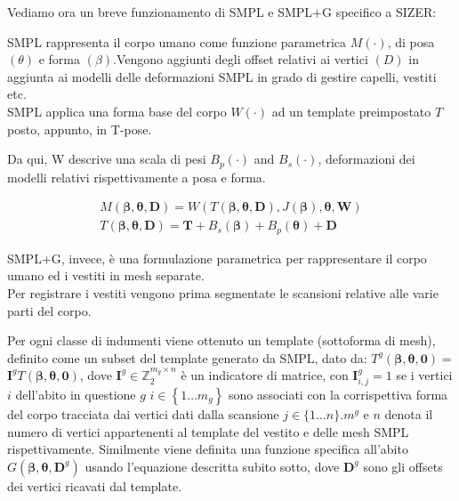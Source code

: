 \medskip

Vediamo ora un breve funzionamento di SMPL e SMPL+G specifico a SIZER:

\medskip

SMPL rappresenta il corpo umano come funzione parametrica $M(\cdot)$, di posa $(\theta)$ e forma $(\beta)$.Vengono aggiunti degli offset relativi ai vertici $(D)$ in aggiunta ai modelli delle deformazioni SMPL in grado di gestire capelli, vestiti etc.\\
SMPL applica una forma base del corpo $W(\cdot)$ ad un template preimpostato $T$ posto, appunto, in T-pose.

\medskip

Da qui, W descrive una scala di pesi $B_{p}(\cdot)$ and $B_{s}(\cdot)$, deformazioni dei modelli relativi rispettivamente a posa e forma.

\medskip

\begin{equation*}
\begin{gathered}
M(\boldsymbol{\beta}, \boldsymbol{\theta}, \mathbf{D})=W(T(\boldsymbol{\beta}, \boldsymbol{\theta}, \mathbf{D}), J(\boldsymbol{\beta}), \boldsymbol{\theta}, \mathbf{W}) \\
T(\boldsymbol{\beta}, \boldsymbol{\theta}, \mathbf{D})=\mathbf{T}+B_{s}(\boldsymbol{\beta})+B_{p}(\boldsymbol{\theta})+\mathbf{D}
\end{gathered}
\end{equation*}

\medskip

SMPL+G, invece, è una formulazione parametrica per rappresentare il corpo umano ed i vestiti in mesh separate.\\
Per registrare i vestiti vengono prima segmentate le scansioni relative alle varie parti del corpo.

\medskip

Per ogni classe di indumenti viene ottenuto un template (sottoforma di mesh), definito come un subset del template generato da SMPL, dato da: $T^{g}(\boldsymbol{\beta}, \boldsymbol{\theta}, \boldsymbol{0})=$ $\mathbf{I}^{g} T(\boldsymbol{\beta}, \boldsymbol{\theta}, \mathbf{0})$, dove $\mathbf{I}^{g} \in \mathbb{Z}_{2}^{m_{g} \times n}$ è un indicatore di matrice, con $\mathbf{I}_{i, j}^{g}=1$ se i vertici $i$ dell'abito in questione $g$ $i \in\left\{1 \ldots m_{g}\right\}$ sono associati con la corrispettiva forma del corpo tracciata dai vertici dati dalla scansione $j \in\{1 \ldots n\} . m^{g}$ e $n$ denota il numero di vertici appartenenti al template del vestito e delle mesh SMPL rispettivamente. Similmente viene definita una funzione specifica all'abito $G\left(\boldsymbol{\beta}, \boldsymbol{\theta}, \mathbf{D}^{g}\right)$ usando l'equazione descritta subito sotto, dove $\mathbf{D}^{g}$ sono gli offsets dei vertici ricavati dal template.

